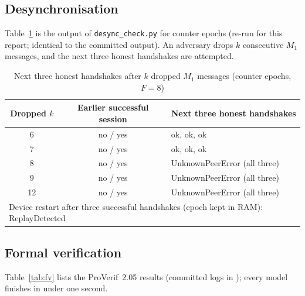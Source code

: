\subsection*{Desynchronisation}
Table~\ref{tab:desync} is the output of \texttt{desync\_check.py} for counter epochs (re-run for this report; identical to the committed output). An adversary drops $k$ consecutive $M_1$ messages, and the next three honest handshakes are attempted.

\begin{table}[H]
\centering
\caption{Next three honest handshakes after $k$ dropped $M_1$ messages (counter epochs, $F=8$)}
\label{tab:desync}
\small
\begin{tabular}{|c|c|l|}
\hline
\textbf{Dropped $k$} & \textbf{Earlier successful session} & \textbf{Next three honest handshakes}\\ \hline
6 & no / yes & ok, ok, ok\\ \hline
7 & no / yes & ok, ok, ok\\ \hline
8 & no / yes & UnknownPeerError (all three)\\ \hline
9 & no / yes & UnknownPeerError (all three)\\ \hline
12 & no / yes & UnknownPeerError (all three)\\ \hline
\multicolumn{3}{|l|}{Device restart after three successful handshakes (epoch kept in RAM): ReplayDetected}\\ \hline
\end{tabular}
\end{table}

\subsection*{Formal verification}
Table~\ref{tab:fv} lists the ProVerif~2.05 results (committed logs in ); every model finishes in under one second.

